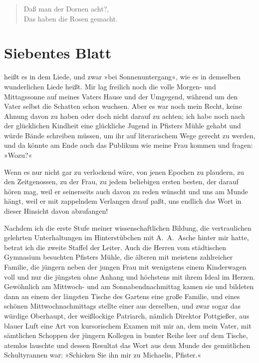 \begin{verse}
Daß man der Dornen acht?,\\
Das haben die Rosen gemacht.
\end{verse}

\section{Siebentes Blatt}

heißt es in dem Liede, und zwar »bei Sonnenuntergang«, wie es in
demselben wunderlichen Liede heißt. Mir lag freilich noch die volle
Morgen- und Mittagssonne auf meines Vaters Hause und der Umgegend,
während um den Vater selbst die Schatten schon wuchsen. Aber es war
noch mein Recht, keine Ahnung davon zu haben oder doch nicht darauf
zu achten; ich habe noch nach der glücklichen Kindheit eine
glückliche Jugend in Pfisters Mühle gehabt und würde Bände
schreiben müssen, um ihr auf literarischem Wege gerecht zu werden,
und da könnte am Ende auch das Publikum wie meine Frau kommen und
fragen: »Wozu?«

Wenn es nur nicht gar zu verlockend wäre, von jenen Epochen zu
plaudern, zu den Zeitgenossen, zu der Frau, zu jedem beliebigen
ersten besten, der darauf hören mag, weil er seinerseits auch davon
zu reden wünscht und uns am Munde hängt, weil er mit zappelndem
Verlangen drauf paßt, uns endlich das Wort in dieser Hinsicht davon
abzufangen!

Nachdem ich die erste Stufe meiner wissenschaftlichen Bildung, die
vertraulichen gelehrten Unterhaltungen im Hinterstübchen mit
A.~A.~Asche hinter mir hatte, betrat ich die zweite Staffel der
Leiter. Auch die Herren vom städtischen Gymnasium besuchten
Pfisters Mühle, die älteren mit meistens zahlreicher Familie, die
jüngern neben der jungen Frau mit wenigstens einem Kinderwagen voll
und nur die jüngsten ohne Anhang und höchstens mit ihrem Ideal im
Herzen. Gewöhnlich am Mittwoch- und am Sonnabendnachmittag kamen
sie und bildeten dann an einem der längsten Tische des Gartens eine
große Familie, und eines schönen Mittwochnachmittags stellte einer
aus derselben, und zwar sogar das würdige Oberhaupt, der
weißlockige Patriarch, nämlich Direktor Pottgießer, aus blauer Luft
eine Art von kursorischem Examen mit mir an, dem mein Vater, mit
sämtlichen Schoppen der jüngern Kollegen in bunter Reihe leer auf
dem Tische, atemlos lauschte und dessen Resultat das Wort aus dem
Munde des gemütlichen Schultyrannen war: »Schicken Sie ihn mir zu
Michaelis, Pfister.«

